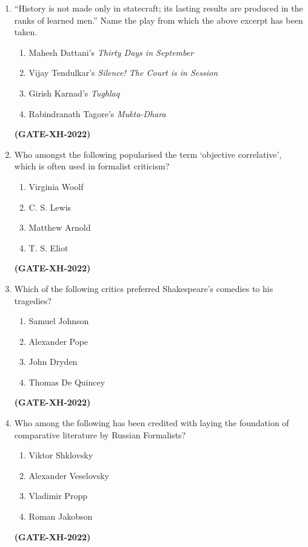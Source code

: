 \documentclass[journal]{IEEEtran}
\begin{document}
\begin{enumerate}
\item ``History is not made only in statecraft; its lasting results are produced in the ranks of learned men.''  
Name the play from which the above excerpt has been taken.
\begin{enumerate}
\item Mahesh Dattani’s \textit{Thirty Days in September}
\item Vijay Tendulkar’s \textit{Silence! The Court is in Session}
\item Girish Karnad’s \textit{Tughlaq}
\item Rabindranath Tagore’s \textit{Mukta-Dhara}
\end{enumerate}
\hfill\textbf{(GATE-XH-2022)}

\item Who amongst the following popularised the term `objective correlative', which is often used in formalist criticism?
\begin{multicols}{2}
\begin{enumerate}
\item Virginia Woolf
\item C. S. Lewis
\item Matthew Arnold
\item T. S. Eliot
\end{enumerate}
\end{multicols}
\hfill\textbf{(GATE-XH-2022)}

\item Which of the following critics preferred Shakespeare’s comedies to his tragedies?
\begin{multicols}{2}
\begin{enumerate}
\item Samuel Johnson
\item Alexander Pope
\item John Dryden
\item Thomas De Quincey
\end{enumerate}
\end{multicols}
\hfill\textbf{(GATE-XH-2022)}

\item Who among the following has been credited with laying the foundation of comparative literature by Russian Formalists?
\begin{multicols}{2}
\begin{enumerate}
\item Viktor Shklovsky
\item Alexander Veselovsky
\item Vladimir Propp
\item Roman Jakobson
\end{enumerate}
\end{multicols}
\hfill\textbf{(GATE-XH-2022)}


\end{enumerate}
\end{document}
